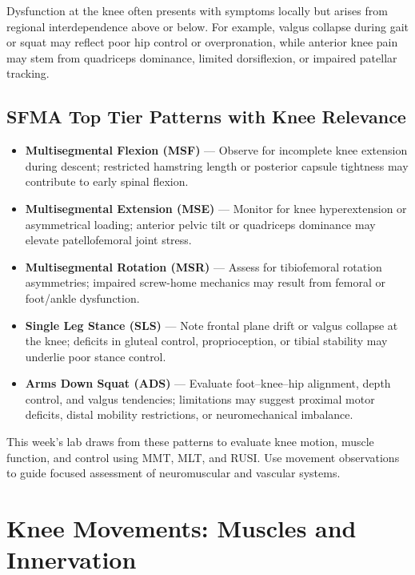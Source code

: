 Dysfunction at the knee often presents with symptoms locally but arises from regional interdependence above or below. For example, valgus collapse during gait or squat may reflect poor hip control or overpronation, while anterior knee pain may stem from quadriceps dominance, limited dorsiflexion, or impaired patellar tracking.

\vspace{0.25cm}
\subsection*{SFMA Top Tier Patterns with Knee Relevance}

\begin{itemize}
  \item \textbf{Multisegmental Flexion (MSF)} — Observe for incomplete knee extension during descent; restricted hamstring length or posterior capsule tightness may contribute to early spinal flexion.
  \item \textbf{Multisegmental Extension (MSE)} — Monitor for knee hyperextension or asymmetrical loading; anterior pelvic tilt or quadriceps dominance may elevate patellofemoral joint stress.
  \item \textbf{Multisegmental Rotation (MSR)} — Assess for tibiofemoral rotation asymmetries; impaired screw-home mechanics may result from femoral or foot/ankle dysfunction.
  \item \textbf{Single Leg Stance (SLS)} — Note frontal plane drift or valgus collapse at the knee; deficits in gluteal control, proprioception, or tibial stability may underlie poor stance control.
  \item \textbf{Arms Down Squat (ADS)} — Evaluate foot–knee–hip alignment, depth control, and valgus tendencies; limitations may suggest proximal motor deficits, distal mobility restrictions, or neuromechanical imbalance.
\end{itemize}

\noindent
This week’s lab draws from these patterns to evaluate knee motion, muscle function, and control using MMT, MLT, and RUSI. Use movement observations to guide focused assessment of neuromuscular and vascular systems.

\section*{Knee Movements: Muscles and Innervation}

